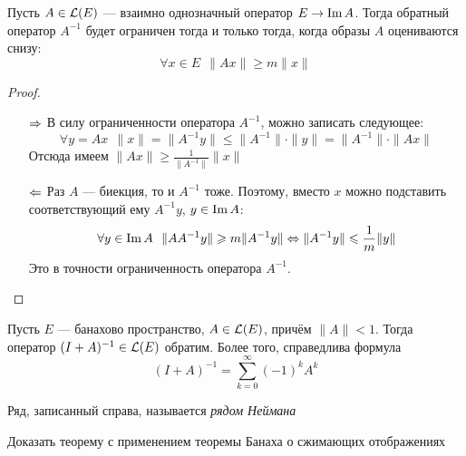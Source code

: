 \begin{theorem} \label{reverse_op_crit}
	Пусть $A \in \mathcal{L}(E)$ --- взаимно однозначный оператор $E \to \operatorname{Im} A$. Тогда обратный оператор $A^{-1}$ будет ограничен тогда и только тогда, когда образы $A$ оцениваются снизу:
	\[
		\forall x \in E\ \ \|Ax\| \ge m\|x\|
	\]
\end{theorem}

\begin{proof}~
	\begin{itemize}
		\item[$\Rightarrow$] В силу ограниченности оператора $A^{-1}$, можно записать следующее:
		\[
			\forall y = Ax\ \ \|x\| = \|A^{-1}y\| \le \|A^{-1}\| \cdot \|y\| = \|A^{-1}\| \cdot \|Ax\|
		\]
		Отсюда имеем $\|Ax\| \ge \frac{1}{\|A^{-1}\|}\|x\|$
		
		\item[$\Leftarrow$] Раз $A$ --- биекция, то и $A^{-1}$ тоже. Поэтому, вместо $x$ можно подставить соответствующий ему $A^{-1}y$, $y \in \operatorname{Im} A$:
		\[
			\forall y \in \operatorname{Im} A\ \ \|AA^{-1}y\| \geqslant m\|A^{-1}y\| \Leftrightarrow \|A^{-1}y\| \leqslant \frac{1}{m}\|y\|
		\]
		Это в точности ограниченность оператора $A^{-1}$.
	\end{itemize}
\end{proof}

\begin{theorem} \label{simple_inverse_op_theorem}
	Пусть $E$ --- банахово пространство, $A \in \mathcal{L}(E)$, причём $\|A\| < 1$. Тогда оператор $(I + A)^{-1} \in \mathcal{L}(E)$ обратим. Более того, справедлива формула
	\[
		(I + A)^{-1} = \sum_{k = 0}^\infty (-1)^kA^k
	\]
\end{theorem}

\begin{note}
	Ряд, записанный справа, называется \textit{рядом Неймана}
\end{note}

\begin{exercise}
	Доказать теорему с применением теоремы Банаха о сжимающих отображениях
\end{exercise}

